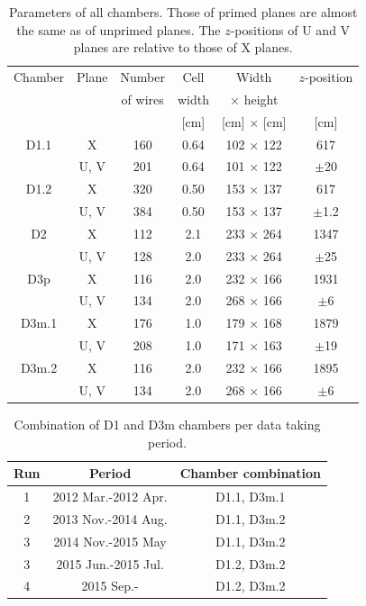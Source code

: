 \begin{table}[bthp]\centering
	\begin{tabular}{cc|cccc}
		\hline \hline
		Chamber & Plane & Number   & Cell  & Width            & $z$-position \\
		&       & of wires & width & $\times$ height  &      \\ 
		&       &          & [cm]  & [cm] $\times$ [cm] & [cm] \\ 
		\hline
		D1.1    & X     & 160      & 0.64  & 102 $\times$ 122 &  617    \\
		& U, V  & 201      & 0.64  & 101 $\times$ 122 & $\pm$20 \\
		D1.2    & X     & 320      & 0.50  & 153 $\times$ 137 &  617    \\
		& U, V  & 384      & 0.50  & 153 $\times$ 137 & $\pm$1.2 \\
		D2      & X     & 112      & 2.1   & 233 $\times$ 264 & 1347    \\
		& U, V  & 128      & 2.0   & 233 $\times$ 264 & $\pm$25 \\
		D3p     & X     & 116      & 2.0   & 232 $\times$ 166 & 1931    \\
		& U, V  & 134      & 2.0   & 268 $\times$ 166 & $\pm$6  \\
		D3m.1   & X     & 176      & 1.0   & 179 $\times$ 168 & 1879    \\
		& U, V  & 208      & 1.0   & 171 $\times$ 163 & $\pm$19 \\
		D3m.2   & X     & 116      & 2.0   & 232 $\times$ 166 & 1895    \\
		& U, V  & 134      & 2.0   & 268 $\times$ 166 & $\pm$6  \\
		\hline
		\hline
	\end{tabular}
	\caption{Parameters of all chambers.
		Those of primed planes are almost the same as of unprimed planes.
		The $z$-positions of U and V planes are relative to those of X planes.
	}
	\label{table:cham:param}
\end{table}

\begin{table}[bthp]\centering
	\begin{tabular}{ccc}
		\hline
		Run & Period & Chamber combination \\
		\hline
		1 & 2012 Mar.-2012 Apr.  &  D1.1, D3m.1 \\
		2 & 2013 Nov.-2014 Aug.  &  D1.1, D3m.2 \\
		3 & 2014 Nov.-2015 May   &  D1.1, D3m.2 \\
		3 & 2015 Jun.-2015 Jul.  &  D1.2, D3m.2 \\
		4 & 2015 Sep.-   &  D1.2, D3m.2 \\
		\hline
	\end{tabular}
	\caption{Combination of D1 and D3m chambers per data taking period.}
	\label{tab:cham:comb1}
\end{table}

